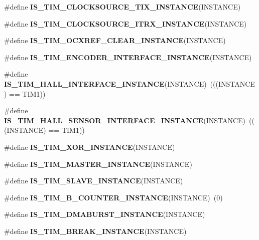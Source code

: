 \begin{DoxyCompactItemize}
\item 
\#define {\bfseries I\+S\+\_\+\+T\+I\+M\+\_\+\+C\+L\+O\+C\+K\+S\+O\+U\+R\+C\+E\+\_\+\+T\+I\+X\+\_\+\+I\+N\+S\+T\+A\+N\+CE}(I\+N\+S\+T\+A\+N\+CE)
\item 
\#define {\bfseries I\+S\+\_\+\+T\+I\+M\+\_\+\+C\+L\+O\+C\+K\+S\+O\+U\+R\+C\+E\+\_\+\+I\+T\+R\+X\+\_\+\+I\+N\+S\+T\+A\+N\+CE}(I\+N\+S\+T\+A\+N\+CE)
\item 
\#define {\bfseries I\+S\+\_\+\+T\+I\+M\+\_\+\+O\+C\+X\+R\+E\+F\+\_\+\+C\+L\+E\+A\+R\+\_\+\+I\+N\+S\+T\+A\+N\+CE}(I\+N\+S\+T\+A\+N\+CE)
\item 
\#define {\bfseries I\+S\+\_\+\+T\+I\+M\+\_\+\+E\+N\+C\+O\+D\+E\+R\+\_\+\+I\+N\+T\+E\+R\+F\+A\+C\+E\+\_\+\+I\+N\+S\+T\+A\+N\+CE}(I\+N\+S\+T\+A\+N\+CE)
\item 
\mbox{\label{group___exported__macro_gacdcc047699e2d83c9d2b3a3f8375dff4}} 
\#define {\bfseries I\+S\+\_\+\+T\+I\+M\+\_\+\+H\+A\+L\+L\+\_\+\+I\+N\+T\+E\+R\+F\+A\+C\+E\+\_\+\+I\+N\+S\+T\+A\+N\+CE}(I\+N\+S\+T\+A\+N\+CE)~(((I\+N\+S\+T\+A\+N\+CE) == T\+I\+M1))
\item 
\mbox{\label{group___exported__macro_ga979ea18ba0931f5ed15cc2f3ac84794b}} 
\#define {\bfseries I\+S\+\_\+\+T\+I\+M\+\_\+\+H\+A\+L\+L\+\_\+\+S\+E\+N\+S\+O\+R\+\_\+\+I\+N\+T\+E\+R\+F\+A\+C\+E\+\_\+\+I\+N\+S\+T\+A\+N\+CE}(I\+N\+S\+T\+A\+N\+CE)~(((I\+N\+S\+T\+A\+N\+CE) == T\+I\+M1))
\item 
\#define {\bfseries I\+S\+\_\+\+T\+I\+M\+\_\+\+X\+O\+R\+\_\+\+I\+N\+S\+T\+A\+N\+CE}(I\+N\+S\+T\+A\+N\+CE)
\item 
\#define {\bfseries I\+S\+\_\+\+T\+I\+M\+\_\+\+M\+A\+S\+T\+E\+R\+\_\+\+I\+N\+S\+T\+A\+N\+CE}(I\+N\+S\+T\+A\+N\+CE)
\item 
\#define {\bfseries I\+S\+\_\+\+T\+I\+M\+\_\+\+S\+L\+A\+V\+E\+\_\+\+I\+N\+S\+T\+A\+N\+CE}(I\+N\+S\+T\+A\+N\+CE)
\item 
\mbox{\label{group___exported__macro_gac41867bf288927ff8ff10a85e67a591b}} 
\#define {\bfseries I\+S\+\_\+\+T\+I\+M\+\_\+B\+\_\+\+C\+O\+U\+N\+T\+E\+R\+\_\+\+I\+N\+S\+T\+A\+N\+CE}(I\+N\+S\+T\+A\+N\+CE)~(0)
\item 
\#define {\bfseries I\+S\+\_\+\+T\+I\+M\+\_\+\+D\+M\+A\+B\+U\+R\+S\+T\+\_\+\+I\+N\+S\+T\+A\+N\+CE}(I\+N\+S\+T\+A\+N\+CE)
\item 
\#define {\bfseries I\+S\+\_\+\+T\+I\+M\+\_\+\+B\+R\+E\+A\+K\+\_\+\+I\+N\+S\+T\+A\+N\+CE}(I\+N\+S\+T\+A\+N\+CE)

\end{DoxyCompactItemize}
